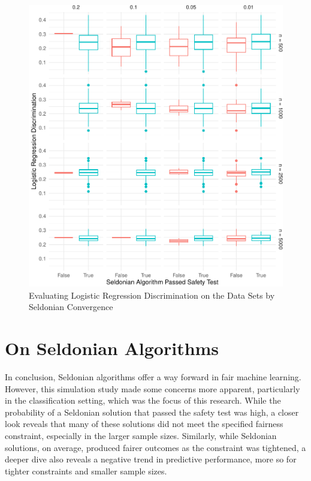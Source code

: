 \documentclass[12pt, twoside]{amherstthesis}
\begin{document}
\begin{figure}

{\centering \includegraphics{Dasha-Asienga_StatThesis_files/figure-latex/ch4fig6-1} 

}

\caption{Evaluating Logistic Regression Discrimination on the Data Sets by Seldonian Convergence}\label{fig:ch4fig6}
\end{figure}
\newpage

\hypertarget{on-seldonian-algorithms}{%
\section{On Seldonian Algorithms}\label{on-seldonian-algorithms}}

In conclusion, Seldonian algorithms offer a way forward in fair machine learning. However, this simulation study made some concerns more apparent, particularly in the classification setting, which was the focus of this research. While the probability of a Seldonian solution that passed the safety test was high, a closer look reveals that many of these solutions did not meet the specified fairness constraint, especially in the larger sample sizes. Similarly, while Seldonian solutions, on average, produced fairer outcomes as the constraint was tightened, a deeper dive also reveals a negative trend in predictive performance, more so for tighter constraints and smaller sample sizes.
\end{document}
